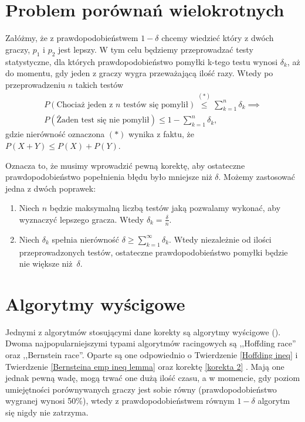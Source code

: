 \documentclass[inzynierska]{pwr_wmat_praca_dyplomowa}
\theoremstyle{plain}
\numberwithin{theorem}{chapter}
\theoremstyle{definition}
\numberwithin{theorem}{chapter}
\begin{document}
	\section{Problem porównań wielokrotnych}
	Załóżmy, że z prawdopodobieństwem $1-\delta$ chcemy wiedzieć który z dwóch graczy, $p_1$ i $p_2$ jest lepszy. W tym
	celu będziemy przeprowadzać testy statystyczne, dla których
	prawdopodobieństwo pomyłki k-tego testu wynosi $\delta_k$, aż do momentu, gdy jeden z graczy wygra przeważającą ilość razy. Wtedy po przeprowadzeniu $n$ takich testów
	\begin{gather*}
		P(\text{Chociaż jeden z $n$ testów się pomylił}) \overset{(*)}{\le} \sum_{k=1}^n \delta_k \implies  \\
	P(\text{Żaden test się nie pomylił}) \le 1 - \sum_{k=1}^n \delta_k,
	\end{gather*} 
	gdzie nierówność oznaczona $(*)$ wynika z faktu, że $P(X+Y) \le P(X) + P(Y)$.
	
	Oznacza to, że musimy wprowadzić pewną korektę, aby
	ostateczne prawdopodobieństwo popełnienia błędu było
	mniejsze niż $\delta$.
	Możemy zastosować jedna z dwóch poprawek:

	\begin{enumerate}[label=\thesection.\arabic*]
		\item \label{korekta 1} Niech $n$ będzie maksymalną liczbą testów jaką pozwalamy wykonać, aby wyznaczyć lepszego
		gracza. Wtedy $\delta_k=\frac{\delta}{n}$.
		\item \label{korekta 2} Niech $\delta_k$ spełnia nierówność $ \delta \ge \sum_{k = 1}^{\infty}\delta_k$. Wtedy niezależnie od
		ilości przeprowadzonych testów, ostateczne
		prawdopodobieństwo pomyłki będzie nie większe niż~$\delta$.
	\end{enumerate}

	\section{Algorytmy wyścigowe}
	Jednymi z algorytmów stosującymi dane korekty są algorytmy wyścigowe
	(). Dwoma najpopularniejszymi typami algorytmów racingowych są ,,Hoffding race'' oraz ,,Bernstein race''.
	Oparte są one odpowiednio o Twierdzenie \ref{Hoffding ineq} i Twierdzenie \ref{Bernsteina emp ineq lemma} oraz korektę \ref{korekta 2} . Mają one jednak pewną wadę, mogą trwać one dużą ilość czasu, a w momencie, gdy poziom umiejętności porównywanych graczy jest sobie równy (prawdopodobieństwo wygranej wynosi 50\%), wtedy z prawdopodobieństwem równym $1-\delta$ algorytm się nigdy nie zatrzyma.
	
\end{document}
